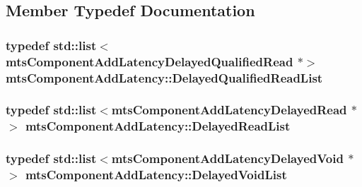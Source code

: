 \subsection{Member Typedef Documentation}
\hypertarget{classmts_component_add_latency_a00e005acc3d0af37d43abee413e92d1e}{
\subsubsection[{Delayed\-Qualified\-Read\-List}]{\setlength{\rightskip}{0pt plus 5cm}typedef std\-::list$<$mts\-Component\-Add\-Latency\-Delayed\-Qualified\-Read $\ast$$>$ {\bf mts\-Component\-Add\-Latency\-::\-Delayed\-Qualified\-Read\-List}\hspace{0.3cm}{\ttfamily [protected]}}}\label{classmts_component_add_latency_a00e005acc3d0af37d43abee413e92d1e}
\hypertarget{classmts_component_add_latency_a527c29b91f407598cb31a8113d453610}{
\subsubsection[{Delayed\-Read\-List}]{\setlength{\rightskip}{0pt plus 5cm}typedef std\-::list$<$mts\-Component\-Add\-Latency\-Delayed\-Read $\ast$$>$ {\bf mts\-Component\-Add\-Latency\-::\-Delayed\-Read\-List}\hspace{0.3cm}{\ttfamily [protected]}}}\label{classmts_component_add_latency_a527c29b91f407598cb31a8113d453610}
\hypertarget{classmts_component_add_latency_a693394372f8f73601e8f46ab5a5a1780}{
\subsubsection[{Delayed\-Void\-List}]{\setlength{\rightskip}{0pt plus 5cm}typedef std\-::list$<$mts\-Component\-Add\-Latency\-Delayed\-Void $\ast$$>$ {\bf mts\-Component\-Add\-Latency\-::\-Delayed\-Void\-List}\hspace{0.3cm}{\ttfamily [protected]}}}\label{classmts_component_add_latency_a693394372f8f73601e8f46ab5a5a1780}
